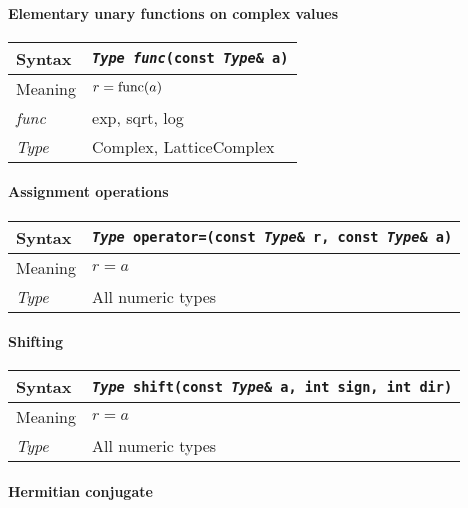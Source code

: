 \documentclass[12pt,letterpaper]{article}
\newcommand{\tLatticeComplex}{LatticeComplex}
\newcommand{\tComplex}{Complex}
\newcommand{\allNumericTypes}{All numeric types}
\newcommand{\itt}{\it Type}
\newcommand{\protoUnary}{{\tt {\it Type func}(const {\it Type}\& a)}}
\newcommand{\protoUnaryShift}{{\tt {\it Type} shift(const {\it Type}\& a, int sign, int dir)}}
\newcommand{\protoAssignmentQual}[1]{{\tt {\it Type} #1(const {\it Type}\& r, const {\it Type}\& a)}}
\begin{document}

\paragraph{Elementary unary functions on complex values}

\begin{flushleft}
  \begin{tabular}{|l|l|}
  \hline
  Syntax      & \protoUnary  \\
  \hline
  Meaning     & $r = {\rm func}(a)$ \\
  \hline
  {\it func}  & exp, sqrt, log \\
  \hline
  \itt        & \tComplex, \tLatticeComplex \\
  \hline
  \end{tabular}
\end{flushleft}

\paragraph{Assignment operations}

\begin{flushleft}
  \begin{tabular}{|l|l|}
  \hline
  Syntax      & \protoAssignmentQual{operator=} \\
  \hline
  Meaning     & $r = a$ \\
  \hline
  \itt     & \allNumericTypes \\
  \hline
  \end{tabular}
\end{flushleft}

\paragraph{Shifting}

\begin{flushleft}
  \begin{tabular}{|l|l|}
  \hline
  Syntax      & \protoUnaryShift  \\
  \hline
  Meaning     & $r = a$ \\
  \hline
  \itt     & \allNumericTypes \\
  \hline
  \end{tabular}
\end{flushleft}


\paragraph{Hermitian conjugate}
\end{document}
